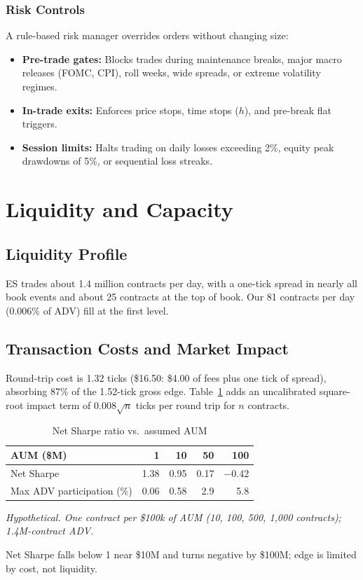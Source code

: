 \documentclass[11pt,letterpaper]{article}
\newcommand{\hyponote}[1]{{\footnotesize\itshape #1\par}}
\begin{document}
\subsubsection{Risk Controls}
A rule-based risk manager overrides orders without changing size:
\begin{itemize}
\item \textbf{Pre-trade gates:} Blocks trades during maintenance breaks, major macro releases (FOMC, CPI), roll weeks, wide spreads, or extreme volatility regimes.
\item \textbf{In-trade exits:} Enforces price stops, time stops ($h$), and pre-break flat triggers.
\item \textbf{Session limits:} Halts trading on daily losses exceeding 2\%, equity peak drawdowns of 5\%, or sequential loss streaks.
\end{itemize}
 
\section{Liquidity and Capacity}
\subsection{Liquidity Profile}
ES trades about 1.4 million contracts per day, with a one-tick spread in nearly all book events and about 25 contracts at the top of book. Our 81 contracts per day (0.006\% of ADV) fill at the first level.

\subsection{Transaction Costs and Market Impact}
Round-trip cost is 1.32 ticks (\$16.50: \$4.00 of fees plus one tick of spread), absorbing 87\% of the 1.52-tick gross edge. Table~\ref{tab:capacity} adds an uncalibrated square-root impact term of $0.008\sqrt{n}$ ticks per round trip for $n$ contracts.

\begin{table}[!htb]
\centering
\caption{Net Sharpe ratio vs.\ assumed AUM}
\label{tab:capacity}
\begin{tabular}{lrrrr}
\toprule
AUM (\$M) & 1 & 10 & 50 & 100 \\
\midrule
Net Sharpe & 1.38 & 0.95 & 0.17 & $-$0.42 \\
Max ADV participation (\%) & 0.06 & 0.58 & 2.9 & 5.8 \\
\bottomrule
\end{tabular}
\par\smallskip
\hyponote{Hypothetical. One contract per \$100k of AUM (10, 100, 500, 1{,}000 contracts); 1.4M-contract ADV.}
\end{table}
Net Sharpe falls below 1 near \$10M and turns negative by \$100M; edge is limited by cost, not liquidity.
 
\end{document}
